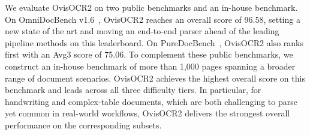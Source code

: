 We evaluate OvisOCR2 on two public benchmarks and an in-house benchmark. On OmniDocBench v1.6~\cite{omnidocbench,omnidocbenchLeaderboard}, OvisOCR2 reaches an overall score of 96.58, setting a new state of the art and moving an end-to-end parser ahead of the leading pipeline methods on this leaderboard. On PureDocBench~\cite{puredocbench}, OvisOCR2 also ranks first with an Avg3 score of 75.06. To complement these public benchmarks, we construct an in-house benchmark of more than 1,000 pages spanning a broader range of document scenarios. OvisOCR2 achieves the highest overall score on this benchmark and leads across all three difficulty tiers. In particular, for handwriting and complex-table documents, which are both challenging to parse yet common in real-world workflows, OvisOCR2 delivers the strongest overall performance on the corresponding subsets.
